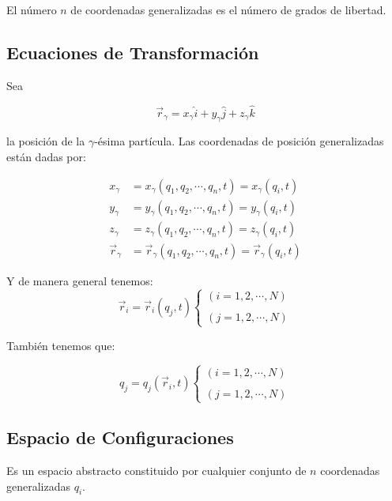 \documentclass[../main]{subfiles}
\begin{document}
El número $n$ de coordenadas generalizadas es el número de grados de libertad.

\subsection*{Ecuaciones de Transformación}

Sea 

\begin{equation}
    \vec{r}_{\gamma} = x_{\gamma}\hat{i}+y_{\gamma}\hat{j}+z_{\gamma}\hat{k}
    \label{eq45}
\end{equation}

la posición de la $\gamma$-ésima partícula. Las coordenadas de posición generalizadas están dadas por:

\begin{align}
    x_{\gamma}&=x_{\gamma}(q_1,q_2,\cdots,q_n,t)=x_{\gamma}(q_i,t) \nonumber \\
    y_{\gamma}&=y_{\gamma}(q_1,q_2,\cdots,q_n,t)=y_{\gamma}(q_i,t) \\
    z_{\gamma}&=z_{\gamma}(q_1,q_2,\cdots,q_n,t)=z_{\gamma}(q_i,t) \nonumber \\
    \vec{r}_{\gamma}&=\vec{r}_{\gamma}(q_1,q_2,\cdots,q_n,t)=\vec{r}_{\gamma}(q_i,t) \nonumber
    \label{eq46}
\end{align}

Y de manera general tenemos:
\begin{equation}
    \vec{r}_i=\vec{r}_i(q_j,t) \left \{ \begin{array}{lcc}
             (i=1,2,\cdots, N)  \\
             \\ (j=1,2,\cdots, N)   
             \end{array} \right.  
             \label{eq47}
\end{equation}
  
También tenemos que:

\begin{equation}
    q_j=q_j(\vec{r}_i,t) \left \{ \begin{array}{lcc}
             (i=1,2,\cdots, N)  \\
             \\ (j=1,2,\cdots, N)   
             \end{array} \right.
             \label{eq48}
\end{equation}

\subsection*{Espacio de Configuraciones}
Es un espacio abstracto constituido por cualquier conjunto de $n$ coordenadas generalizadas $q_i$.
\end{document}
